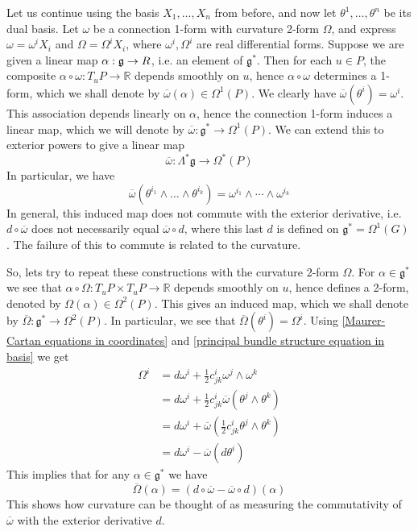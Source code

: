 Let us continue using the basis $X_1,\ldots,X_n$ from before, and now let $\theta^1,\ldots,\theta^n$ be its dual basis. Let $\omega$ be a connection 1-form with curvature 2-form $\Omega$, and express $\omega = \omega^i X_i$ and $\Omega = \Omega^i X_i$, where $\omega^i,\Omega^i$ are real differential forms. Suppose we are given a linear map $\alpha : \mathfrak g \rightarrow \mathbb \mathbb R$, i.e. an element of $\mathfrak g^*$. Then for each $u \in P$, the composite $\alpha \circ \omega : T_u P \rightarrow \mathbb R$ depends smoothly on $u$, hence $\alpha \circ \omega$ determines a 1-form, which we shall denote by $\overline{\omega}(\alpha) \in \Omega^1(P)$. We clearly have $\overline{\omega}(\theta^i) = \omega^i$. This association depends linearly on $\alpha$, hence the connection 1-form induces a linear map, which we will denote by $\overline{\omega} : \mathfrak g^* \rightarrow \Omega^1(P)$. We can extend this to exterior powers to give a linear map 
\[ \overline{\omega} : \Lambda^* \mathfrak g \rightarrow \Omega^*(P) \]
In particular, we have
\[ \overline{\omega}(\theta^{i_1} \wedge \ldots \wedge \theta^{i_k}) = \omega^{i_1} \wedge \cdots \wedge \omega^{i_k} \]
In general, this induced map does not commute with the exterior derivative, i.e. $d \circ \overline{\omega}$ does not necessarily equal $\overline{\omega} \circ d$, where this last $d$ is defined on $\mathfrak g^* = \Omega^1(G)$. The failure of this to commute is related to the curvature.

So, lets try to repeat these constructions with the curvature 2-form $\Omega$. For $\alpha \in \mathfrak g^*$ we see that $\alpha \circ \Omega : T_u P \times T_u P \rightarrow \mathbb R$ depends smoothly on $u$, hence defines a 2-form, denoted by $\Omega(\alpha) \in \Omega^2(P)$. This gives an induced map, which we shall denote by $\overline{\Omega} : \mathfrak g^* \rightarrow \Omega^2(P)$. In particular, we see that $\overline{\Omega}(\theta^i) = \Omega^i$. Using \eqref{Maurer-Cartan equations in coordinates} and \eqref{principal bundle structure equation in basis} we get
\begin{align*}
	\Omega^i &= d\omega^i + \frac{1}{2} c_{jk}^i \omega^j \wedge \omega^k \\
	         &= d\omega^i + \frac{1}{2} c_{jk}^i \overline{\omega}(\theta^j \wedge \theta^k) \\
	         &= d\omega^i + \overline{\omega}\left( \frac{1}{2} c_{jk}^i \theta^j \wedge \theta^k \right) \\
	         &= d\omega^i - \overline{\omega}(d\theta^i)
\end{align*}
This implies that for any $\alpha \in \mathfrak g^*$ we have
\[ \overline{\Omega}(\alpha) = (d \circ \overline{\omega} - \overline{\omega} \circ d)(\alpha) \]
This shows how curvature can be thought of as measuring the commutativity of $\overline{\omega}$ with the exterior derivative $d$. 





